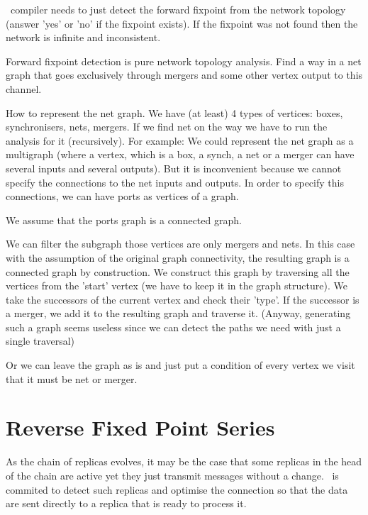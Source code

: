 
\ak\ compiler needs to just detect the forward fixpoint from the network topology (answer 'yes' or 'no' if the fixpoint exists). If the fixpoint was not found then the network is infinite and inconsistent.

Forward fixpoint detection is pure network topology analysis. Find a way in a net graph that goes exclusively through mergers and some other vertex output to this channel.

How to represent the net graph.
We have (at least) 4 types of vertices: boxes, synchronisers, nets, mergers.
If we find net on the way we have to run the analysis for it (recursively). For example:
%
We could represent the net graph as a multigraph (where a vertex, which is a box, a synch, a net or a merger can have several inputs and several outputs).
But it is inconvenient because we cannot specify the connections to the net inputs and outputs. In order to specify this connections, we can have ports as vertices of a graph.

We assume that the ports graph is a connected graph.

We can filter the subgraph those vertices are only mergers and nets. In this case with the assumption of the original graph connectivity, the resulting graph is a connected graph by construction.
We construct this graph by traversing all the vertices from the 'start' vertex (we have to keep it in the graph structure). We take the successors of the current vertex and check their 'type'. If the successor is a merger, we add it to the resulting graph and traverse it. (Anyway, generating such a graph seems useless since we can detect the paths we need with just a single traversal)

Or we can leave the graph as is and just put a condition of every vertex we visit that it must be net or merger.



    \section{Reverse Fixed Point Series\label{rfp}}
As the chain of replicas evolves, it may be the case that some replicas in the head of the chain are active yet they just transmit messages without a change. \ak\ is commited to detect such replicas and optimise the connection so that the data are sent directly to a replica that is ready to process it. 

